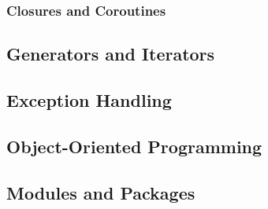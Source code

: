 \subsubsection{Closures and Coroutines}

\subsection{Generators and Iterators}

\subsection{Exception Handling}

\subsection{Object-Oriented Programming}

\subsection{Modules and Packages}
